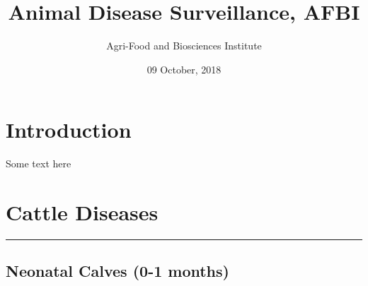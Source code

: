 \documentclass[]{book}
\title{Animal Disease Surveillance, AFBI}
\author{Agri-Food and Biosciences Institute}
\date{09 October, 2018}
\begin{document}
\maketitle

{
\setcounter{tocdepth}{1}
\tableofcontents
}
\chapter*{}\label{section}

\chapter{Introduction}\label{intro}

Some text here

\chapter{Cattle Diseases}\label{cattle-diseases}

\begin{center}\rule{0.5\linewidth}{\linethickness}\end{center}

\section{Neonatal Calves (0-1 months)}\label{neonatal-calves-0-1-months}
\end{document}
